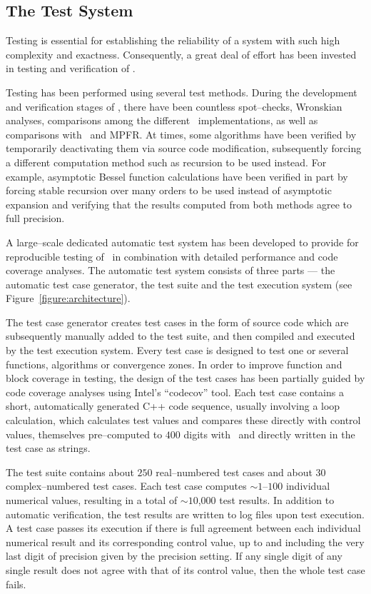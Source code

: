 \subsection{The Test System}

Testing is essential for establishing the reliability of a system
with such high complexity and exactness.
Consequently, a great deal of effort has been invested in testing
and verification of \efloat.

Testing has been performed using several test methods.
During the development and verification stages of \efloat,
there have been countless spot--checks,
Wronskian analyses, comparisons among the different
\efloatclass\ implementations, as well as comparisons with
\mathematica\ and MPFR. At times, some algorithms have been verified
by temporarily deactivating them via source code modification,
subsequently forcing a different computation method
such as recursion to be used instead.
For example, asymptotic Bessel function calculations have been
verified in part by forcing stable recursion over many orders
to be used instead of asymptotic expansion and verifying that the
results computed from both methods agree to full precision.

A large--scale dedicated automatic test system has been developed
to provide for reproducible testing of \efloat\ in combination with
detailed performance and code coverage analyses.
The automatic test system consists of
three parts --- the automatic test case generator,
the test suite and the test execution system
(see Figure~\ref{figure:architecture}).

The test case generator creates test cases in the form of
source code which are subsequently manually added
to the test suite, and then compiled and executed by the
test execution system. Every test case is designed to test
one or several functions, algorithms or convergence zones.
In order to improve function and block coverage in testing,
the design of the test cases has been partially guided by
code coverage analyses using
Intel{\footnotesize {\textregistered}}'s ``codecov'' tool.
Each test case contains a short, automatically generated
C++ code sequence, usually involving a loop calculation,
which calculates test values and compares these directly with
control values, themselves pre--computed to $400$ digits with
\mathematica\ and directly written in the test case as strings.

The test suite contains about $250$ real--num\-ber\-ed test cases
and about $30$ com\-plex--num\-ber\-ed test cases. Each test case
computes $\sim$$1$--$100$ individual numerical values,
resulting in a total of $\sim$$10$,$000$ test results.
In addition to automatic verification, the test results
are written to log files upon test execution.
A test case passes its execution if there is full agreement
between each individual numerical result and its corresponding
control value, up to and including the very last digit of precision
given by the precision setting. If any single digit of any single
result does not agree with that of its control value, then the
whole test case fails.

